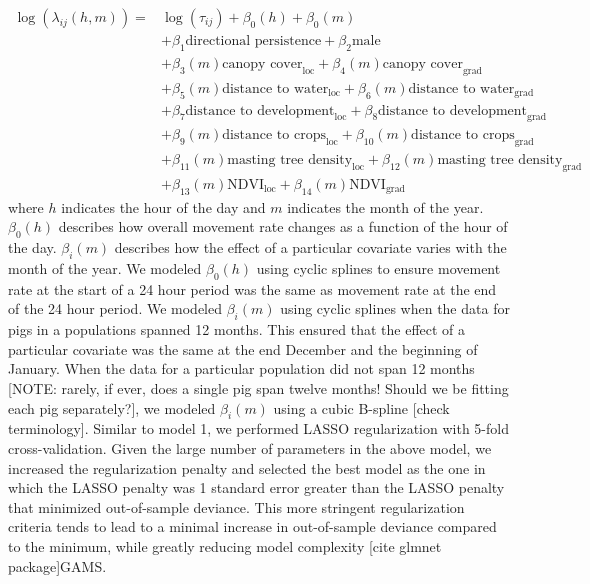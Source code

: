 \documentclass[a4paper]{article}
\begin{document}
\begin{align}
  \log(\lambda_{ij}(h, m)) = & \log(\tau_{ij}) + \beta_0(h) + \beta_0(m) \\
  & + \beta_1 \text{directional persistence} + \beta_2 \text{male  } \\
  & + \beta_{3}(m) \text{canopy cover}_{\text{loc}} + \beta_{4}(m) \text{canopy cover}_{\text{grad}} \\
  & + \beta_5(m) \text{distance to water}_{\text{loc}} + \beta_6(m) \text{distance to water}_{\text{grad}} \\
  & + \beta_7 \text{distance to development}_{\text{loc}} + \beta_8 \text{distance to development}_{\text{grad}} \\
  & + \beta_9(m) \text{distance to crops}_{\text{loc}} + \beta_{10}(m) \text{distance to crops}_{\text{grad}} \\
  & + \beta_{11}(m) \text{masting tree density}_{\text{loc}} + \beta_{12}(m) \text{masting tree density}_{\text{grad}} \\
  & + \beta_{13}(m) \text{NDVI}_{\text{loc}} + \beta_{14}(m) \text{NDVI}_{\text{grad}}
\end{align}
where $h$ indicates the hour of the day and $m$ indicates the month of the year.  $\beta_0(h)$ describes how overall movement rate changes as a function of the hour of the day. $\beta_i(m)$ describes how the effect of a particular covariate varies with the month of the year. We modeled $\beta_0(h)$ using cyclic splines to ensure movement rate at the start of a 24 hour period was the same as movement rate at the end of the 24 hour period. We modeled $\beta_i(m)$ using cyclic splines when the data for pigs in a populations spanned 12 months. This ensured that the effect of a particular covariate was the same at the end December and the beginning of January.  When the data for a particular population did not span 12 months [NOTE: rarely, if ever, does a single pig span twelve months! Should we be fitting each pig separately?], we modeled $\beta_i(m)$ using a cubic B-spline [check terminology]. Similar to model 1, we performed LASSO regularization with 5-fold cross-validation.  Given the large number of parameters in the above model, we increased the regularization penalty and selected the best model as the one in which the LASSO penalty was 1 standard error greater than the LASSO penalty that minimized out-of-sample deviance. This more stringent regularization criteria tends to lead to a minimal increase in out-of-sample deviance compared to the minimum, while greatly reducing model complexity [cite glmnet package]GAMS. 
\end{document}
